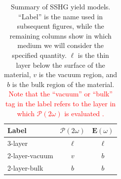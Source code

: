 \documentclass[prb,superscriptaddress,showpacs,twocolumn,letterpaper]{revtex4}
\newcommand{\correction}[1]{\textcolor{red}{#1}}
\begin{document}
\begin{table}[b]
\begin{ruledtabular}
\begin{tabular}{ l c c }
Label         &  $\boldsymbol{\mathcal{P}}(2\omega)$  &  $\mathbf{E}(\omega)$ \\
\hline
3-layer         &           $\ell$          &      $\ell$   \\
2-layer-vacuum  &            $v$            &        $b$    \\
2-layer-bulk    &            $b$            &        $b$    
\end{tabular}
\end{ruledtabular}
\caption{Summary of SSHG yield models. ``Label'' is the name used in subsequent
figures, while the remaining columns show in which medium we will consider the
specified quantity. $\ell$ is the thin layer below the surface of the material,
$v$ is the vacuum region, and $b$ is the bulk region of the
material. 
\correction{
Note that the ``vacuum'' or ``bulk'' tag in the label refers to the layer in
which $\boldsymbol{\mathcal{P}}(2\omega)$  is evaluated
. 
}
\label{tab:models}}
\end{table}
\end{document}
